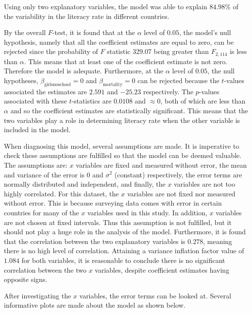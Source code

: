 \documentclass[]{article}
\begin{document}
Using only two explanatory variables, the model was able to explain
\(84.98\%\) of the variability in the literacy rate in different
countries.

By the overall \(F\)-test, it is found that at the \(\alpha\) level of
\(0.05\), the model's null hypothesis, namely that all the coefficient
estimates are equal to zero, can be rejected since the probability of
\(F\) statistic 329.07 being greater than \(F_{2, 114}\) is less than
\(\alpha\). This means that at least one of the coefficient estimate is
not zero. Therefore the model is adequate. Furthermore, at the
\(\alpha\) level of \(0.05\), the null hypotheses,
\(\beta_{\text{girlsnoschool}} = 0\) and
\(\beta_{\text{mortality}} = 0\) can be rejected because the
\(t\)-values associated the estimates are \(2.591\) and \(-25.23\)
respectively. The \(p\)-values associated with these \(t\)-statistics
are \(0.0108\) and \(\approx 0\), both of which are less than \(\alpha\)
and so the coefficient estimates are statistically significant. This
means that the two variables play a role in determining literacy rate
when the other variable is included in the model.

When diagnosing this model, several assumptions are made. It is
imperative to check these assumptions are fulfilled so that the model
can be deemed valuable. The assumptions are: \(x\) variables are fixed
and measured without error, the mean and variance of the error is \(0\)
and \(\sigma^2\) (constant) respectively, the error terms are normally
distributed and independent, and finally, the \(x\) variables are not
too highly correlated. For this dataset, the \(x\) variables are not
fixed nor measured without error. This is because surveying data comes
with error in certain countries for many of the \(x\) variables used in
this study. In addition, \(x\) variables are not chosen at fixed
intervals. Thus this assumption is not fulfilled, but it should not play
a huge role in the analysis of the model. Furthermore, it is found that
the correlation between the two explanatory variables is \(0.278\),
meaning there is no high level of correlation. Attaining a variance
inflation factor value of \(1.084\) for both variables, it is reasonable
to conclude there is no significant correlation between the two \(x\)
variables, despite coefficient estimates having opposite signs.

After investigating the \(x\) variables, the error terms can be looked
at. Several informative plots are made about the model as shown below.
\end{document}
